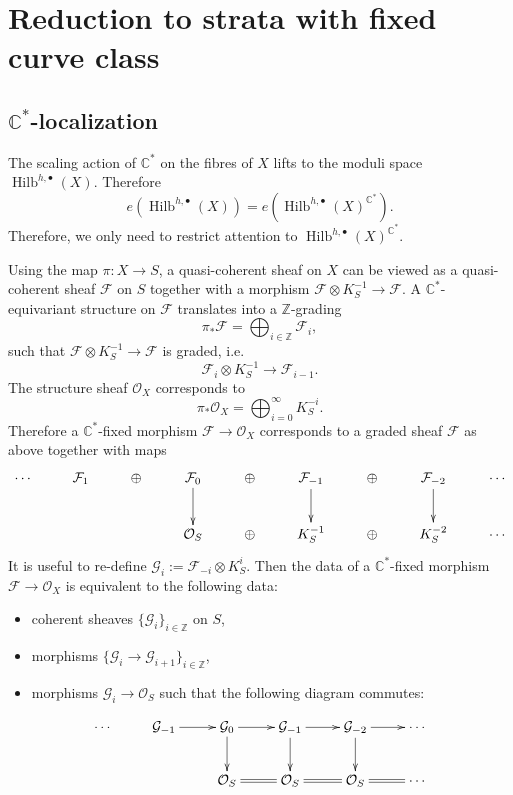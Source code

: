 \documentclass{amsart}
\theoremstyle{definition}
\newcommand{\CC} {\mathbb{C}}          %
\newcommand{\ZZ} {\mathbb{Z}}		%
\renewcommand{\O}{\mathcal{O}}
\newcommand{\Hilb}{\operatorname{Hilb}}
\newcommand{\F}{\mathcal{F}}
\newcommand{\G}{\mathcal{G}}
\begin{document}
\section{Reduction to strata with fixed curve class}

\subsection{$\CC^*$-localization} The scaling action of $\CC^*$ on the fibres of $X$ lifts to the moduli space $\Hilb^{h,\bullet}(X)$. Therefore
$$
e(\Hilb^{h,\bullet}(X)) = e(\Hilb^{h,\bullet}(X)^{\CC^*}).
$$
Therefore, we only need to restrict attention to $\Hilb^{h,\bullet}(X)^{\CC^*}$. 

Using the map $\pi : X \rightarrow S$, a quasi-coherent sheaf on $X$ can be viewed as a quasi-coherent sheaf $\F$ on $S$ together with a morphism $\F \otimes K_{S}^{-1} \rightarrow \F$. A $\CC^*$-equivariant structure on $\F$ translates into a $\ZZ$-grading
$$
\pi_* \F = \bigoplus_{i \in \ZZ} \F_i,
$$
such that $\F \otimes K_{S}^{-1} \rightarrow \F$ is graded, i.e.
$$
\F_i \otimes K_{S}^{-1} \longrightarrow \F_{i-1}.
$$
The structure sheaf $\O_X$ corresponds to 
$$
\pi_* \O_X = \bigoplus_{i=0}^{\infty} K_{S}^{-i}.
$$
Therefore a $\CC^*$-fixed morphism $\F \rightarrow \O_X$ corresponds to a graded sheaf $\F$ as above together with maps
\begin{displaymath}
\xymatrix
{
\cdots & \F_1 & \oplus & \F_0 \ar[d] & \oplus & \F_{-1} \ar[d] & \oplus & \F_{-2} \ar[d] & \cdots \\
& & & \O_S & \oplus & K_{S}^{-1} & \oplus & K_{S}^{-2} & \cdots 
}
\end{displaymath}
It is useful to re-define $\G_i := \F_{-i} \otimes K_{S}^{i}$. Then the data of a $\CC^*$-fixed morphism $\F \rightarrow \O_X$ is equivalent to the following data:
\begin{itemize}
\item coherent sheaves $\{\G_i\}_{i \in \ZZ}$ on $S$,
\item morphisms $\{\G_i \rightarrow \G_{i+1}\}_{i \in \ZZ}$,
\item morphisms $\G_i \rightarrow \O_S$ such that the following diagram commutes:
\end{itemize}
\begin{displaymath}
\xymatrix
{
\cdots & \G_{-1} \ar[r] & \G_0 \ar[r] \ar[d] & \G_{-1} \ar[r] \ar[d] & \G_{-2} \ar[r] \ar[d] & \cdots \\
& & \O_S \ar@{=}[r]& \O_S \ar@{=}[r] & \O_S \ar@{=}[r] & \cdots 
}
\end{displaymath}
\end{document}
